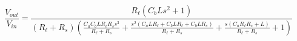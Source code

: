 \begin{equation}
\frac{V_{out}}{V_{in}} = \frac{R_{\ell} \left(C_{b} L s^{2} + 1\right)}{\left(R_{\ell} + R_{s}\right) \left(\frac{C_{a} C_{b} L R_{\ell} R_{s} s^{3}}{R_{\ell} + R_{s}} + \frac{s^{2} \left(C_{a} L R_{\ell} + C_{b} L R_{\ell} + C_{b} L R_{s}\right)}{R_{\ell} + R_{s}} + \frac{s \left(C_{a} R_{\ell} R_{s} + L\right)}{R_{\ell} + R_{s}} + 1\right)}
\label{eq-H1}
\end{equation}

